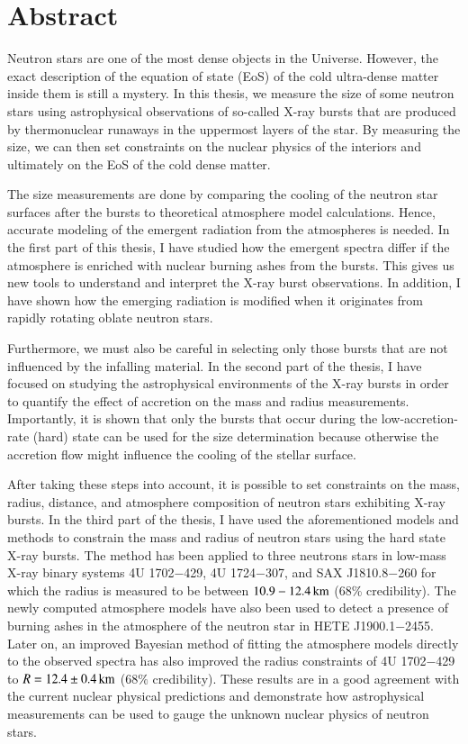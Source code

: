 \chapter*{Abstract}

Neutron stars are one of the most dense objects in the Universe.
However, the exact description of the equation of state (EoS) of the cold ultra-dense matter inside them is still a mystery.
In this thesis, we measure the size of some neutron stars using astrophysical observations of so-called X-ray bursts that are produced by thermonuclear runaways in the uppermost layers of the star.
By measuring the size, we can then set constraints on the nuclear physics of the interiors and ultimately on the EoS of the cold dense matter.

The size measurements are done by comparing the cooling of the neutron star surfaces after the bursts to theoretical atmosphere model calculations.
Hence, accurate modeling of the emergent radiation from the atmospheres is needed.
In the first part of this thesis, I have studied how the emergent spectra differ if the atmosphere is enriched with nuclear burning ashes from the bursts.
This gives us new tools to understand and interpret the X-ray burst observations.
In addition, I have shown how the emerging radiation is modified when it originates from rapidly rotating oblate neutron stars.

Furthermore, we must also be careful in selecting only those bursts that are not influenced by the infalling material.
In the second part of the thesis, I have focused on studying the astrophysical environments of the X-ray bursts in order to quantify the effect of accretion on the mass and radius measurements.
Importantly, it is shown that only the bursts that occur during the low-accretion-rate (hard) state can be used for the size determination because otherwise the accretion flow might influence the cooling of the stellar surface.

After taking these steps into account, it is possible to set constraints on the mass, radius, distance, and atmosphere composition of neutron stars exhibiting X-ray bursts.
In the third part of the thesis, I have used the aforementioned models and methods to constrain the mass and radius of neutron stars using the hard state X-ray bursts.
The method has been applied to three neutrons stars in low-mass X-ray binary systems 4U 1702$-$429, 4U 1724$-$307, and SAX J1810.8$-$260 for which the radius is measured to be between $10.9 - 12.4\, \mathrm{km}$ ($68$\% credibility).
The newly computed atmosphere models have also been used to detect a presence of burning ashes in the atmosphere of the neutron star in HETE J1900.1$-$2455.
Later on, an improved Bayesian method of fitting the atmosphere models directly to the observed spectra has also improved the radius constraints of 4U 1702$-$429 to $R = 12.4 \pm 0.4\, \mathrm{km}$ ($68\%$ credibility). 
These results are in a good agreement with the current nuclear physical predictions and demonstrate how astrophysical measurements can be used to gauge the unknown nuclear physics of neutron stars.


